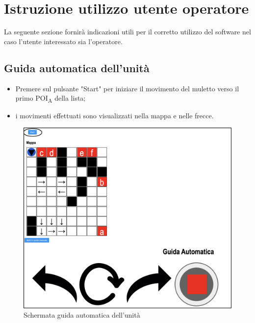 \section{Istruzione utilizzo utente operatore}

La seguente sezione fornirà indicazioni utili per il corretto utilizzo del software nel caso l'utente interessato sia l'operatore.
\subsection{Guida automatica dell'unità}
\begin{itemize}
    \item Premere sul pulsante "Start" per iniziare il movimento del muletto verso il primo POI\textsubscript{A} della lista;
    \item i movimenti effettuati sono visualizzati nella mappa e nelle frecce.
    
\end{itemize}
\begin{figure}[H]
    \centering
    \includegraphics[scale=0.45]{res/images/forklift_start.png}
    \caption{Schermata guida automatica dell'unità}
\end{figure}
\pagebreak
